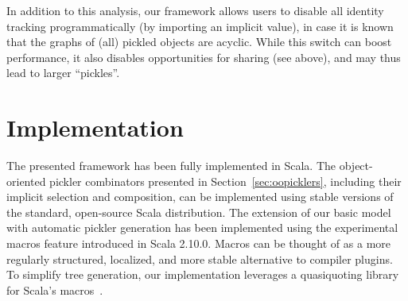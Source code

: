 In addition to this analysis, our framework allows users to disable all
identity tracking programmatically (by importing an implicit value), in case it is known that the graphs of
(all) pickled objects are acyclic. While this switch can boost performance, it
also disables opportunities for sharing (see above), and may thus lead to
larger ``pickles''.



\section{Implementation}

The presented framework has been fully implemented in Scala.
The object-oriented pickler combinators presented in
Section~\ref{sec:oopicklers}, including their implicit selection and
composition, can be implemented using stable versions of the standard, open-source
Scala distribution. The extension of our basic model with
automatic pickler generation has been implemented using the experimental
macros feature introduced in Scala 2.10.0. Macros can be thought of as a
more regularly structured, localized, and more stable alternative to compiler
plugins. To simplify tree generation, our implementation leverages a
quasiquoting library for Scala's macros~\cite{Quasiquotes}.










